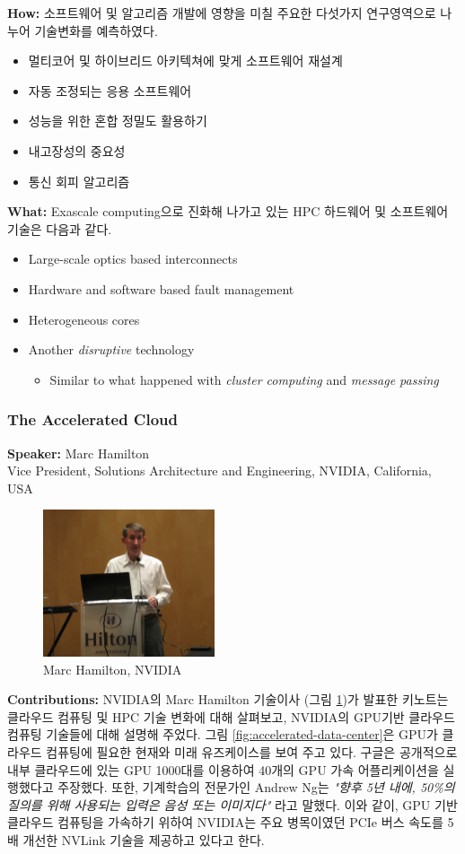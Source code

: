 \documentclass[twocolumn]{article}
\newcommand{\bi}{\begin{itemize}}
\newcommand{\ei}{\end{itemize}}
\newcommand{\ii}{\item}
\begin{document}
\noindent
\textbf{How:}  소프트웨어 및 알고리즘 개발에 영향을 미칠 주요한 다섯가지 연구영역으로 나누어 기술변화를 예측하였다.
\bi
\ii 멀티코어 및 하이브리드 아키텍쳐에 맞게 소프트웨어 재설계 
\ii 자동 조정되는 응용 소프트웨어
\ii  성능을 위한 혼합 정밀도 활용하기
\ii 내고장성의 중요성
\ii 통신 회피 알고리즘
\ei

\noindent
\textbf{What:} Exascale computing으로 진화해 나가고 있는 HPC 하드웨어 및 소프트웨어 기술은 다음과 같다.
\bi
\ii Large-scale optics based interconnects
\ii Hardware and software based fault management
\ii Heterogeneous cores
\ii Another \textit{disruptive} technology
\bi
\ii Similar to what happened with \textit{cluster computing} and \textit{message passing}
\ei
\ei

\subsubsection{The Accelerated Cloud}
\textbf{Speaker:} Marc Hamilton\\
Vice President, Solutions Architecture and Engineering, NVIDIA, California, USA
\begin{figure}[htb]
        \centering
        \includegraphics[width=0.45\textwidth]{marc.png}
        \caption{Marc Hamilton, NVIDIA}
        \label{fig:marc}
\end{figure}

\noindent
\textbf{Contributions:}  NVIDIA의 Marc Hamilton 기술이사 (그림 \ref{fig:marc})가 발표한 키노트는 
클라우드 컴퓨팅 및 HPC 기술 변화에 대해 살펴보고, NVIDIA의 GPU기반 클라우드 컴퓨팅 기술들에 대해 설명해 주었다. 
그림 \ref{fig:accelerated-data-center}은 GPU가 클라우드 컴퓨팅에 필요한 현재와 미래 유즈케이스를 보여 주고 있다.
구글은 공개적으로 내부 클라우드에 있는 GPU 1000대를 이용하여 40개의 GPU 가속 어플리케이션을 실행했다고 주장했다.
또한, 기계학습의 전문가인 Andrew Ng는 \textit{"향후 5년 내에, 50\%의 질의를 위해 사용되는 입력은 음성 또는 이미지다"} 라고 말했다.
이와 같이, GPU 기반 클라우드 컴퓨팅을 가속하기 위하여 NVIDIA는 주요 병목이였던 PCIe 버스 속도를 5배 개선한 NVLink 기술을 제공하고 있다고 한다.
\end{document}

